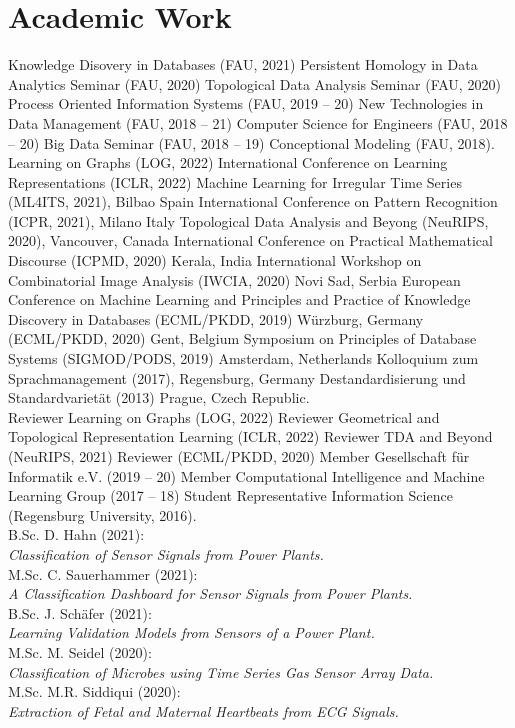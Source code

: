 \documentclass[a4paper,11pt]{article}
\newcommand{\years}[1]{\marginnote{\scriptsize #1}}
\begin{document}
\section*{Academic Work}
\years{Lectures} Knowledge Disovery in Databases (FAU, 2021) \bullet{} Persistent Homology in Data Analytics Seminar (FAU, 2020) \bullet{} Topological Data Analysis Seminar (FAU, 2020) \bullet{} Process Oriented Information Systems (FAU, 2019 -- 20) \bullet{} New Technologies in Data Management (FAU, 2018 -- 21) \bullet{} Computer Science for Engineers (FAU, 2018 -- 20) \bullet{} Big Data Seminar (FAU, 2018 -- 19) \bullet{} Conceptional Modeling (FAU, 2018). \\
\years{Conferences} Learning on Graphs (LOG, 2022) \bullet{} International Conference on Learning Representations (ICLR, 2022) \bullet{} Machine Learning for Irregular Time Series (ML4ITS, 2021), Bilbao Spain \bullet{} International Conference on Pattern Recognition (ICPR, 2021), Milano Italy \bullet{} Topological Data Analysis and Beyong (NeuRIPS, 2020), Vancouver, Canada \bullet{} International Conference on Practical Mathematical Discourse (ICPMD, 2020) Kerala, India \bullet{} International Workshop on Combinatorial Image Analysis (IWCIA, 2020) Novi Sad, Serbia \bullet{} European Conference on Machine Learning and Principles and Practice of Knowledge Discovery in Databases (ECML/PKDD, 2019) Würzburg, Germany  (ECML/PKDD, 2020) Gent, Belgium \bullet{} Symposium on Principles of Database Systems (SIGMOD/PODS, 2019) Amsterdam, Netherlands \bullet{} Kolloquium zum Sprachmanagement (2017), Regensburg, Germany \bullet{} Destandardisierung und Standardvarietät (2013) Prague, Czech Republic. \\
\years{Service} Reviewer Learning on Graphs (LOG, 2022) \bullet{} Reviewer Geometrical and Topological Representation Learning (ICLR, 2022) \bullet{} Reviewer TDA and Beyond (NeuRIPS, 2021) \bullet{} Reviewer (ECML/PKDD, 2020) \bullet{} Member Gesellschaft für Informatik e.V. (2019 -- 20) \bullet{} Member Computational Intelligence and Machine Learning Group (2017 -- 18) \bullet{} Student Representative Information Science (Regensburg University, 2016).\\
\years{Supervision} B.Sc. D. Hahn (2021):\\
\emph{Classification of Sensor Signals from Power Plants.} \\
M.Sc. C. Sauerhammer (2021): \\
\emph{A Classification Dashboard for Sensor Signals from Power Plants.} \\
B.Sc. J. Schäfer (2021): \\
\emph{Learning Validation Models from Sensors of a Power Plant.} \\
M.Sc. M. Seidel (2020): \\ 
\emph{Classification of Microbes using Time Series Gas Sensor Array Data.} \\
M.Sc. M.R. Siddiqui (2020): \\
\emph{Extraction of Fetal and Maternal Heartbeats from ECG Signals.}
\end{document}
